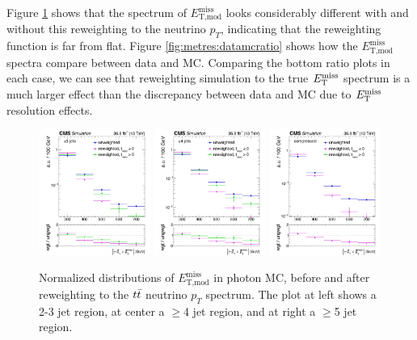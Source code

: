 Figure \ref{fig:metres:reweighting} shows that the spectrum of
$E_\text{T,mod}^\text{miss}$ looks considerably different with and
without this reweighting to the neutrino $p_T$, indicating that the
reweighting function is far from flat. Figure
\ref{fig:metres:datamcratio} shows how the $E_\text{T,mod}^\text{miss}$
spectra compare between data and MC. Comparing the bottom ratio plots in each
case, we can see that reweighting simulation to the true $E_\text{T}^\text{miss}$
spectrum is a much larger effect than the discrepancy between data and
MC due to $E_\text{T}^\text{miss}$ resolution effects.

\begin{figure}[htb]
\centering
\includegraphics[width=0.325\textwidth]{figures/metres_PhotonMC_WgtVsUnwgt_AB.pdf}
\includegraphics[width=0.325\textwidth]{figures/metres_PhotonMC_WgtVsUnwgt_CDEFGH.pdf}
\includegraphics[width=0.325\textwidth]{figures/metres_PhotonMC_WgtVsUnwgt_I.pdf}
\caption{Normalized distributions of $E_\text{T,mod}^\text{miss}$ in
  photon MC, before and after reweighting to the $t\bar{t}$ neutrino $p_T$
  spectrum. The plot at left shows a 2-3 jet region, at center a
  $\geq$4 jet region, and at right a $\geq$5 jet region.}
\label{fig:metres:reweighting}
\end{figure}

